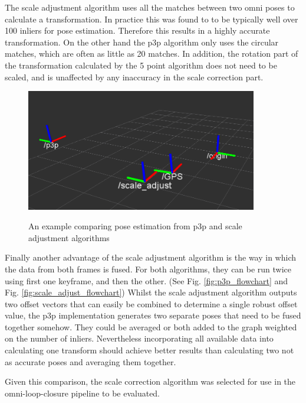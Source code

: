 The scale adjustment algorithm uses all the matches between two omni poses to calculate a transformation.  In practice this was found to to be typically well over 100 inliers for pose estimation.  Therefore this results in a highly accurate transformation.  On the other hand the p3p algorithm only uses the circular matches, which are often as little as 20 matches.  In addition, the rotation part of the transformation calculated by the 5 point algorithm does not need to be scaled, and is unaffected by any inaccuracy in the scale correction part.

\begin{figure}[h]
  \centering
    \includegraphics[width=0.9\textwidth]{chapters/images/scale_vs_p3p_1}\\
  \caption{An example comparing pose estimation from p3p and scale adjustment algorithms}
  \label{fig:scale_vs_p3p}
\end{figure}


Finally another advantage of the scale adjustment algorithm is the way in which the data from both frames is fused.  For both algorithms, they can be run twice using first one keyframe, and then the other. (See Fig. \ref{fig:p3p_flowchart} and Fig. \ref{fig:scale_adjust_flowchart})   Whilst the scale adjustment algorithm outputs two offset vectors that can easily be combined to determine a single robust offset value, the p3p implementation generates two separate poses that need to be fused together somehow.  They could be averaged or both added to the graph weighted on the number of inliers. Nevertheless incorporating all available data into calculating one transform should achieve better results than calculating two not as accurate poses and averaging them together.

Given this comparison, the scale correction algorithm was selected for use in the omni-loop-closure pipeline to be evaluated.

